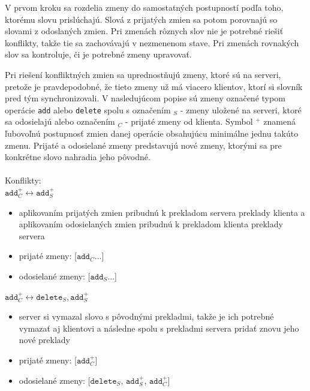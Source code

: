 \documentclass[
  digital, %
  table,   %
  lof,     %
  lot,     %
]{fithesis3}
\begin{document}
V prvom kroku sa rozdelia zmeny do samostatných postupností podľa toho, ktorému slovu prislúchajú. Slová z prijatých zmien sa potom porovnajú so slovami z odoslaných zmien. Pri zmenách rôznych slov nie je potrebné riešiť konflikty, takže tie sa zachovávajú v nezmenenom stave. Pri zmenách rovnakých slov sa kontroluje, či je potrebné zmeny upravovať.

Pri riešení konfliktných zmien sa uprednostňujú zmeny, ktoré sú na serveri, pretože je pravdepodobné, že tieto zmeny už má viacero klientov, ktorí si slovník pred tým synchronizovali. V nasledujúcom popise sú zmeny označené typom operácie \texttt{add} alebo \texttt{delete} spolu s označením $_S$ - zmeny uložené na serveri, ktoré sa odosielajú alebo označením $_C$ - prijaté zmeny od klienta. Symbol $^+$ znamená ľubovoľnú postupnosť zmien danej operácie obsahujúcu minimálne jednu takúto zmenu. Prijaté a odosielané zmeny predstavujú nové zmeny, ktorými sa pre konkrétne slovo nahradia jeho pôvodné.
\\
\\
Konflikty:
\\
\noindent
$\texttt{add}_{C}^+ \longleftrightarrow \texttt{add}_{S}^+$
\begin{itemize}
\item aplikovaním prijatých zmien pribudnú k prekladom servera preklady klienta a aplikovaním odosielaných zmien pribudnú k prekladom klienta preklady servera 
\item prijaté zmeny: [$\texttt{add}_{C}...$]
\item odosielané zmeny: [$\texttt{add}_{S}...$] 
\end{itemize}

\noindent
$\texttt{add}_{C}^+ \longleftrightarrow \texttt{delete}_{S}, \texttt{add}_{S}^+$
\begin{itemize}
\item server si vymazal slovo s pôvodnými prekladmi, takže je ich potrebné vymazať aj klientovi a následne spolu s prekladmi servera pridať znovu jeho nové preklady
\item prijaté zmeny: [$\texttt{add}_{C}^+$]
\item odosielané zmeny: [$\texttt{delete}_{S}$, $\texttt{add}_{S}^+$, $\texttt{add}_{C}^+$] 
\end{itemize}
\end{document}

